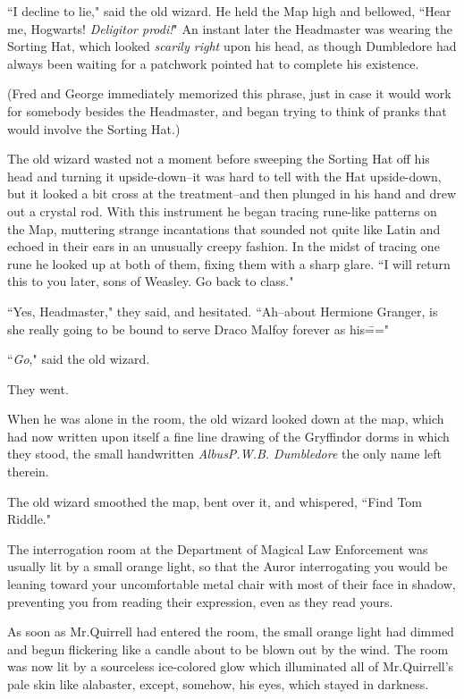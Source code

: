 ``I decline to lie," said the old wizard. He held the Map high and bellowed, ``Hear me, Hogwarts! \emph{Deligitor prodi!}" An instant later the Headmaster was wearing the Sorting Hat, which looked \emph{scarily right} upon his head, as though Dumbledore had always been waiting for a patchwork pointed hat to complete his existence.

(Fred and George immediately memorized this phrase, just in case it would work for somebody besides the Headmaster, and began trying to think of pranks that would involve the Sorting Hat.)

The old wizard wasted not a moment before sweeping the Sorting Hat off his head and turning it upside-down\---it was hard to tell with the Hat upside-down, but it looked a bit cross at the treatment\---and then plunged in his hand and drew out a crystal rod. With this instrument he began tracing rune-like patterns on the Map, muttering strange incantations that sounded not quite like Latin and echoed in their ears in an unusually creepy fashion. In the midst of tracing one rune he looked up at both of them, fixing them with a sharp glare. ``I will return this to you later, sons of Weasley. Go back to class."

``Yes, Headmaster," they said, and hesitated. ``Ah\---about Hermione Granger, is she really going to be bound to serve Draco Malfoy forever as his\==="

``\emph{Go}," said the old wizard.

They went.

When he was alone in the room, the old wizard looked down at the map, which had now written upon itself a fine line drawing of the Gryffindor dorms in which they stood, the small handwritten \emph{Albus\?P.\?W.\?B. Dumbledore} the only name left therein.

The old wizard smoothed the map, bent over it, and whispered, ``Find Tom Riddle."

\later

The interrogation room at the Department of Magical Law Enforcement was usually lit by a small orange light, so that the Auror interrogating you would be leaning toward your uncomfortable metal chair with most of their face in shadow, preventing you from reading their expression, even as they read yours.

As soon as Mr.\?Quirrell had entered the room, the small orange light had dimmed and begun flickering like a candle about to be blown out by the wind. The room was now lit by a sourceless ice-colored glow which illuminated all of Mr.\?Quirrell's pale skin like alabaster, except, somehow, his eyes, which stayed in darkness.

